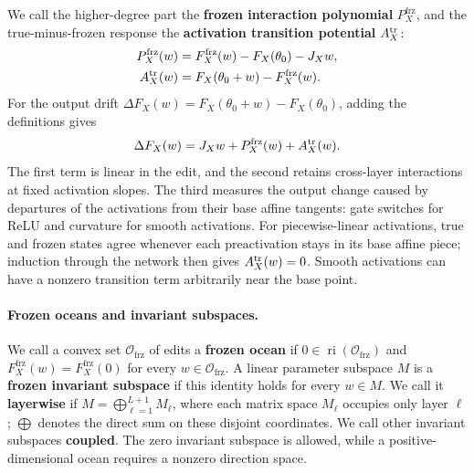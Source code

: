 \documentclass[twoside]{article}
\theoremstyle{remark}
\DeclareMathOperator{\ri}{ri}
\newcommand{\frz}{\mathrm{frz}}
\theoremstyle{highlightdefinition}
\theoremstyle{remark}
\begin{document}
We call the higher-degree part the \textbf{frozen interaction polynomial} $P_X^{\frz}$, and the true-minus-frozen response the \textbf{activation transition potential} $A_X^{\rm tr}$:
\begin{align*}
 P_X^{\frz}(w)&=F_X^{\frz}(w)-F_X(\theta_0)-J_Xw,\\
 A_X^{\rm tr}(w)&=F_X(\theta_0+w)-F_X^{\frz}(w).
\end{align*}
For the output drift $\Delta F_X(w)=F_X(\theta_0+w)-F_X(\theta_0)$, adding the definitions gives
\begin{equation}
 \Delta F_X(w)=J_Xw+P_X^{\frz}(w)+A_X^{\rm tr}(w).
 \label{eq:app-decomp}
\end{equation}
The first term is linear in the edit, and the second retains cross-layer interactions at fixed activation slopes. The third measures the output change caused by departures of the activations from their base affine tangents: gate switches for ReLU and curvature for smooth activations. For piecewise-linear activations, true and frozen states agree whenever each preactivation stays in its base affine piece; induction through the network then gives $A_X^{\rm tr}(w)=0$. Smooth activations can have a nonzero transition term arbitrarily near the base point.

\paragraph{Frozen oceans and invariant subspaces.}
We call a convex set $\mathcal O_{\frz}$ of edits a \textbf{frozen ocean} if $0\in\ri(\mathcal O_{\frz})$ and $F_X^{\frz}(w)=F_X^{\frz}(0)$ for every $w\in\mathcal O_{\frz}$. A linear parameter subspace $M$ is a \textbf{frozen invariant subspace} if this identity holds for every $w\in M$. We call it \textbf{layerwise} if $M=\bigoplus_{\ell=1}^{L+1}M_\ell$, where each matrix space $M_\ell$ occupies only layer $\ell$; $\bigoplus$ denotes the direct sum on these disjoint coordinates. We call other invariant subspaces \textbf{coupled}. The zero invariant subspace is allowed, while a positive-dimensional ocean requires a nonzero direction space.
\end{document}
